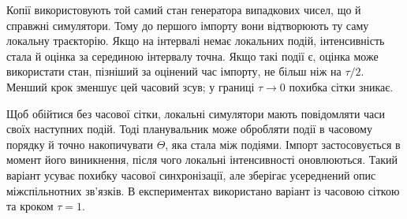 \begin{algorithm}[H]
\color{black}
\caption{\textcolor{black}{Один запуск двомасштабного симулятора з узгодженням за часовою сіткою.}}
\label{alg:scheduler}
\small
{}
\end{algorithm}

Копії використовують той самий стан генератора випадкових чисел, що й справжні симулятори. Тому до першого імпорту вони відтворюють ту саму локальну траєкторію. Якщо на інтервалі немає локальних подій, інтенсивність стала й оцінка за серединою інтервалу точна. Якщо такі події є, оцінка може використати стан, пізніший за оцінений час імпорту, не більш ніж на $\tau/2$. Менший крок зменшує цей часовий зсув; у границі $\tau\to0$ похибка сітки зникає.

Щоб обійтися без часової сітки, локальні симулятори мають повідомляти часи своїх наступних подій. Тоді планувальник може обробляти події в часовому порядку й точно накопичувати $\Theta$, яка стала між подіями. Імпорт застосовується в момент його виникнення, після чого локальні інтенсивності оновлюються. Такий варіант усуває похибку часової синхронізації, але зберігає усереднений опис міжспільнотних зв'язків. В експериментах використано варіант із часовою сіткою та кроком $\tau=1$.

